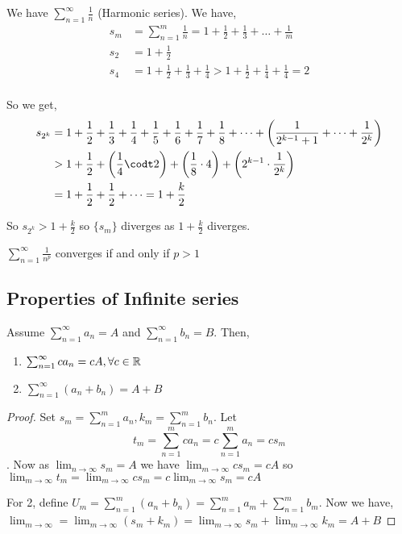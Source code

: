 \begin{eg}
	We have $\sum_{n = 1}^{\infty} \frac{1}{n}$ (Harmonic series). We have,
	\begin{align*}
		s_m &= \sum_{n = 1}^{m}  \frac{1}{n} = 1 + \frac{1}{2} + \frac{1}{3} + \dots + \frac{1}{m}\\
		s_2 &= 1 + \frac{1}{2}\\
		s_4 &= 1 + \frac{1}{2} + \frac{1}{3} + \frac{1}{4} > 1 + \frac{1}{2} + \frac{1}{4} + \frac{1}{4} = 2\\
	\end{align*}

	So we get,
	\begin{align*}
		s_{2^{k}} &= 1 + \frac{1}{2} + \frac{1}{3} + \frac{1}{4} + \frac{1}{5} + \frac{1}{6} + \frac{1}{7} + \frac{1}{8} + \dots +\left ( \frac{1}{2^{k - 1} + 1} + \dots + \frac{1}{2^{k}} \right )\\
			  &> 1 + \frac{1}{2} + \left (\frac{1}{4}\codt 2 \right) + \left ( \frac{1}{8} \cdot 4 \right ) + \left ( 2^{k - 1} \cdot \frac{1}{2^{k}} \right )\\
			  &= 1 + \frac{1}{2} + \frac{1}{2} + \dots = 1 + \frac{k}{2}
	\end{align*}

	So $s_{2^{k}} > 1 + \frac{k}{2}$ so $\{s_m\}$ diverges as $1 + \frac{k}{2}$ diverges.
\end{eg}

\begin{prop}
	$\sum_{n = 1}^{\infty} \frac{1}{n^{p}}$ converges if and only if $p > 1$
\end{prop}

\subsection{Properties of Infinite series}
\begin{theorem}
	Assume $\sum_{n = 1}^{\infty} a_n = A$ and $\sum_{n = 1}^{\infty} b_n = B$. Then, 
	\begin{enumerate}
		\item $\sum_{n = 1}^{\infty} ca_n = cA, \forall c \in \mathbb{R}$
		\item $\sum_{n = 1}^{\infty} (a_n + b_n) = A + B$
	\end{enumerate}
\end{theorem}
\begin{proof}
	Set $s_m = \sum_{n = 1}^{m} a_n, k_m = \sum_{n = 1}^{m} b_n$. Let $$t_m = \sum_{n = 1}^{m} ca_n  = c \sum_{n = 1}^{m} a_n = cs_m$$. Now as $\lim_{n \to \infty} s_m = A$ we have $\lim_{m \to \infty} cs_m = cA$ so $\lim_{m \to \infty} t_m = \lim_{m \to \infty} c s_m = c \lim_{m \to \infty} s_m = cA$

	\vspace{1em}
	
	For 2, define $U_m = \sum_{n = 1}^{m} (a_n + b_n) = \sum_{n = 1}^{m} a_m + \sum_{n = 1}^{m} b_m$. Now we have, $\lim_{m \to \infty}  = \lim_{m \to \infty} (s_m + k_m) = \lim_{m \to \infty} s_m + \lim_{m \to \infty} k_m = A + B$
\end{proof}

